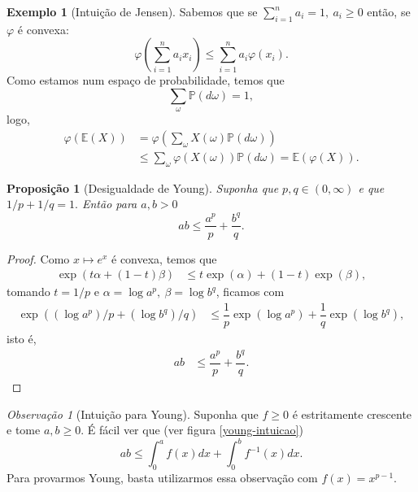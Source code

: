 \documentclass[12pt,a4paper,oneside]{book}
\newtheorem{proposition}[theorem]{Proposi\c{c}\~ao}
\theoremstyle{definition}
\newtheorem{example}[theorem]{Exemplo}
\theoremstyle{remark}
\newtheorem{remark}[theorem]{Observa\c{c}\~ao}
\numberwithin{equation}{section}
\newcommand{\E}{\mathbb{E}}
\newcommand{\pr}{\mathbb{P}}
\begin{document}
\begin{tcolorbox}
\begin{example}[Intuição de Jensen]
Sabemos que se $\sum_{i=1}^n a_i=1,\ a_i\geq 0$ então, se $\varphi$ é convexa:
$$\varphi\left(\sum_{i=1}^n a_ix_i\right)\leq\sum_{i=1}^n a_i\varphi(x_i).$$
Como estamos num espaço de probabilidade, temos que 
$$ \sum_\omega \pr(d\omega) =  1,$$
logo,
\begin{align*}
\varphi(\E(X)) &= \varphi\left(\sum_\omega X(\omega) \pr(d\omega)\right)\\
&\leq\sum_{\omega} \varphi(X(\omega))\pr(d\omega) = \E(\varphi(X)).
\end{align*}

\end{example}
\end{tcolorbox}

\begin{proposition}[Desigualdade de Young]
Suponha que $p,q\in (0,\infty)$ e que $1/p+1/q=1.$ Então para $a,b>0$
$$ab \leq \dfrac{a^p}{p}+\dfrac{b^q}{q}. $$
\end{proposition}

\begin{proof}
Como $x\mapsto e^x$ é convexa, temos que
\begin{align*}
\exp(t\alpha+(1-t)\beta) &\leq t\exp(\alpha) + (1-t)\exp(\beta),
\end{align*}
tomando $t=1/p$ e $\alpha= \log a^p,\ \beta=\log b^q$, ficamos com
\begin{align*}
\exp((\log a^p)/p+(\log b^q)/q)  &\leq \dfrac{1}{p}\exp(\log a^p)+ \dfrac{1}{q}\exp(\log b^q),
\end{align*}
isto é,
\begin{align*}
ab  &\leq \dfrac{a^p}{p}+ \dfrac{b^q}{q}.
\end{align*}
\end{proof}


\begin{tcolorbox}[colback = yellow!60]
\begin{remark}[Intuição para Young] Suponha que $f\geq 0$ é estritamente crescente e tome  $a,b\geq 0$. É fácil ver que (ver figura \ref{young-intuicao})
$$ab \leq \int_0^a f(x)dx +\int_0^b f^{-1}(x)dx. $$
Para provarmos Young, basta utilizarmos essa observação com $f(x) = x^{p-1}.$
\end{remark}



\end{tcolorbox}
\end{document}
